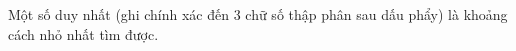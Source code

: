 Một số duy nhất (ghi chính xác đến 3 chữ số thập phân sau dấu phẩy) là khoảng cách nhỏ nhất tìm được.  

\